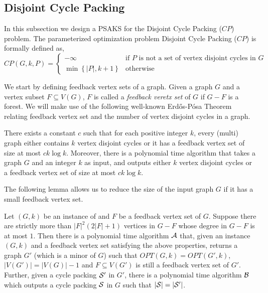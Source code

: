 

\subsection{Disjoint Cycle Packing}
In this subsection we  design a PSAKS for the {\sc Disjoint Cycle Packing ($CP$)} problem. 
The parameterized optimization problem {\sc Disjoint Cycle Packing ($CP$)} is formally defined as,
\[
    CP(G,k,P)=\left\{ 
\begin{array}{rl}
    -\infty & \text{if $P$ is not a set of vertex disjoint cycles in $G$} \\
    \min\left\{|P|,k+1\right\} & \text{otherwise}
\end{array}\right.
\]




We start by defining feedback vertex sets of a graph. Given a graph $G$ and a vertex subset $F\subseteq V(G)$, $F$ is called a {\em feedback veretx set} of $G$ if $G-F$ is a forest. 
We will make use of the following well-known Erd\H{o}s-P\'{o}sa Theorem relating feedback vertex set and the number of vertex disjoint  cycles in a graph. 
\begin{lemma}
\label{lemma:erdosposa}
There exists a constant $c$ such that for each positive integer $k$, every (multi) graph either contains $k$ vertex disjoint cycles or it has a feedback vertex set of size at most $ck\log k$. Moreover, there is a polynomial time algorithm that takes a graph $G$ and an integer $k$ as input, and outputs either $k$ vertex disjoint cycles or a feedback vertex set of size at most $ck\log k$. 
\end{lemma}

 The following lemma allows us to reduce the size of the input 
graph $G$ if it has a small feedback vertex set. 

\begin{lemma}
 \label{lemma:leaf}
 Let $(G,k)$ be an instance of \CP{} and $F$ be a feedback vertex set of $G$. Suppose there are strictly  
 more than $\vert F\vert^2(2\vert F\vert+1)$ vertices in $G-F$ whose degree in $G-F$ is at most $1$. 
Then there is a polynomial time 
algorithm ${\cal A}$ that, given an instance $(G,k)$ and a feedback vertex set satisfying the above properties,
  returns a graph $G'$ (which is a minor of $G$) such that $OPT(G,k)=OPT(G',k)$, $\vert V(G')\vert =\vert V(G)\vert -1$ and $F \subseteq V(G')$ is still a feedback vertex set of $G'$.  
Further, given a cycle packing ${\cal S'}$ in $G'$, there is a polynomial time algorithm ${\cal B}$ which 
outputs a cycle packing ${\cal S}$ in $G$ such that $\vert {\cal S}\vert=\vert {\cal S'}\vert$. 
\end{lemma}


